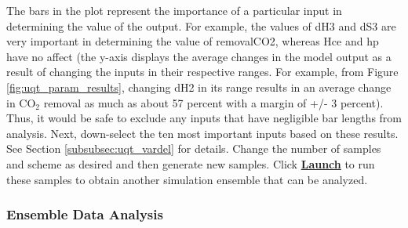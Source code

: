 The bars in the plot represent the importance of a particular input in determining the value of the output. For example, the values of dH3 and dS3 are very important in determining the value of removalCO2, whereas Hce and hp have no affect (the y-axis displays the average changes in the model output as a result of changing the inputs in their respective ranges. For example, from Figure \ref{fig:uqt_param_results}, changing dH2 in its range results in an average change in CO$_2$ removal as much as about 57 percent with a margin of +/- 3 percent). Thus, it would be safe to exclude any inputs that have negligible bar lengths from analysis. Next, down-select the ten most important inputs based on these results. See Section \ref{subsubsec:uqt_vardel} for details. Change the number of samples and scheme as desired and then generate new samples. Click \textbf{\underline{Launch}} to run these samples to obtain another simulation ensemble that can be analyzed.

\subsubsection{Ensemble Data Analysis}

